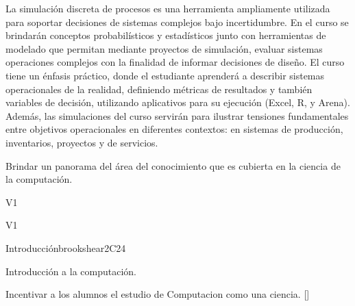 \begin{syllabus}


\begin{justification}
La simulación discreta de procesos es una herramienta ampliamente utilizada
para soportar decisiones de sistemas complejos bajo incertidumbre. En el curso se brindarán conceptos probabilísticos
 y estadísticos junto con herramientas de modelado que permitan mediante proyectos de simulación, evaluar sistemas operaciones complejos con la finalidad de informar decisiones de diseño.
El curso tiene un énfasis práctico, donde el estudiante aprenderá a describir sistemas
operacionales de la realidad, definiendo métricas de resultados y también variables de decisión, utilizando aplicativos para su ejecución (Excel, R, y Arena). Además, las simulaciones del curso servirán para ilustrar tensiones fundamentales entre objetivos operacionales
en diferentes contextos: en sistemas de producción, inventarios, proyectos y de servicios.
\end{justification}

\begin{goals}
\item Brindar un panorama del área del conocimiento que es cubierta en la ciencia de la computación.
\end{goals}

\begin{outcomes}{V1}
    \item {}
\end{outcomes}

\begin{competences}{V1}
    \item {} 
    \item {} 
    \item {}
    \item {}
\end{competences}

\begin{unit}{Introducción}{}{brookshear}{2}{C24}
    \begin{topics}
	\item Introducción a la computación.
   \end{topics}
   \begin{learningoutcomes}
      \item Incentivar a los alumnos el estudio de Computacion como una ciencia. [\Familiarity]
   \end{learningoutcomes}
\end{unit}


\end{syllabus}
